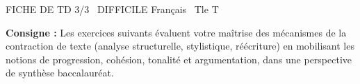 \documentclass[11pt]{article}
\begin{document}
\begin{tcolorbox}[enhanced,colback=popink,colframe=popink,arc=10pt,boxrule=0pt,left=12pt,right=12pt,top=9pt,bottom=9pt]
{\color{white}\popxbold\small FICHE DE TD 3/3 \textbullet\ DIFFICILE \hfill Français \textbullet\ Tle T\par}
\end{tcolorbox}
\vspace{4pt}
\noindent\textbf{Consigne :} Les exercices suivants évaluent votre maîtrise des mécanismes de la contraction de texte (analyse structurelle, stylistique, réécriture) en mobilisant les notions de progression, cohésion, tonalité et argumentation, dans une perspective de synthèse baccalauréat.
\end{document}
